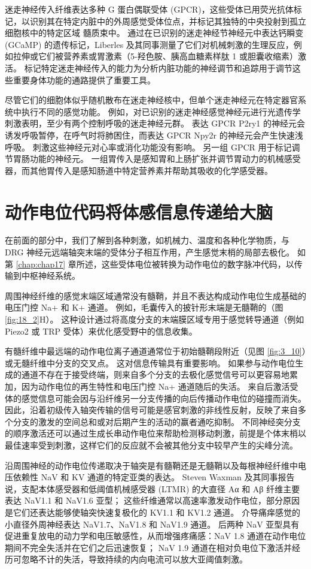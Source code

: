 迷走神经传入纤维表达多种 G 蛋白偶联受体 (GPCR)，这些受体已用荧光抗体标记，以识别其在特定内脏中的外周感觉受体位点，并标记其独特的中央投射到孤立细胞核中的特定区域 髓质束中。 
通过在已识别的迷走神经节神经元中表达钙瞬变 (GCaMP) 的遗传标记，Liberles 及其同事测量了它们对机械刺激的生理反应，例如拉伸或它们被营养素或胃激素（5-羟色胺、胰高血糖素样肽 1 或胆囊收缩素）激活。 
标记特定迷走神经传入的能力为分析内脏功能的神经调节和追踪用于调节这些重要身体功能的通路提供了重要工具。


尽管它们的细胞体似乎随机散布在迷走神经核中，但单个迷走神经元在特定器官系统中执行不同的感觉功能。 
例如，对已识别的迷走神经感觉神经元进行光遗传学刺激表明，至少有两个控制呼吸的迷走神经元群。 
表达 GPCR P2ry1 的神经元会诱发呼吸暂停，在呼气时将肺困住，而表达 GPCR Npy2r 的神经元会产生快速浅呼吸。 
刺激这些神经元对心率或消化功能没有影响。 
另一组 GPCR 用于标记调节胃肠功能的神经元。 
一组胃传入是感知胃和上肠扩张并调节胃动力的机械感受器，而其他胃传入是感知肠道中特定营养素并帮助其吸收的化学感受器。


\section{动作电位代码将体感信息传递给大脑}
在前面的部分中，我们了解到各种刺激，如机械力、温度和各种化学物质，与 DRG 神经元远端轴突末端的受体分子相互作用，产生感觉末梢的局部去极化。 
如第 \ref{chap:chap17} 章所述，这些受体电位被转换为动作电位的数字脉冲代码，以传输到中枢神经系统。


周围神经纤维的感觉末端区域通常没有髓鞘，并且不表达构成动作电位生成基础的电压门控 Na+ 和 K+ 通道。 
例如，毛囊传入的披针形末端是无髓鞘的（图 \ref{fig:18_2}H）。 
这种设计通过将高度分支的末端膜区域专用于感觉转导通道（例如 Piezo2 或 TRP 受体）来优化感受野中的信息收集。


有髓纤维中最远端的动作电位离子通道通常位于初始髓鞘段附近（见图 \ref{fig:3_10}）或无髓纤维中分支的交叉点。 
这对信息传输具有重要影响。 
如果参与动作电位生成的通道不存在于接受终端，则来自多个分支的去极化感觉信号可以更容易地累加，因为动作电位的再生特性和电压门控 Na+ 通道随后的失活。 
来自后激活受体的感觉信息可能会因与沿纤维另一分支传播的向后传播动作电位的碰撞而消失。 
因此，沿着初级传入轴突传输的信号可能是感官刺激的非线性反射，反映了来自多个分支的激发的空间总和或对后期产生的活动的赢者通吃抑制。 
不同神经突分支的顺序激活还可以通过生成长串动作电位来帮助检测移动刺激，前提是个体末梢以最佳速率受到刺激，这样它们的反应就不会被其他分支中较早产生的尖峰分流。


沿周围神经的动作电位传递取决于轴突是有髓鞘还是无髓鞘以及每根神经纤维中电压依赖性 NaV 和 KV 通道的特定亚类的表达。 
Steven Waxman 及其同事报告说，支配本体感受器和低阈值机械感受器 (LTMR) 的大直径 Aα 和 Aβ 纤维主要表达 NaV1.1 和 NaV1.6 亚型； 这些纤维通常以高速率激发动作电位，部分原因是它们还表达能够使轴突快速复极化的 KV1.1 和 KV1.2 通道。 
介导痛痒感觉的小直径外周神经表达 NaV1.7、NaV1.8 和 NaV1.9 通道。 
后两种 NaV 亚型具有促进重复放电的动力学和电压敏感性，从而增强疼痛感：NaV 1.8 通道在动作电位期间不完全失活并在它们之后迅速恢复； NaV 1.9 通道在相对负电位下激活并经历可忽略不计的失活，导致持续的内向电流可以放大亚阈值刺激。


